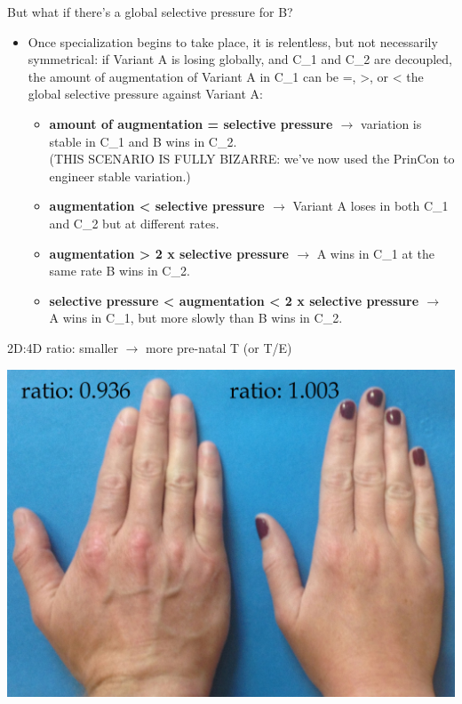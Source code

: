 \documentclass[hyperref={pdfpagelabels=false}]{beamer}
\begin{document}


\begin{frame}{But what if there's a global selective pressure for B?}
		\begin{itemize}
			\item Once specialization begins to take place, it is relentless, but not necessarily symmetrical: if Variant A is losing globally, and C_1 and C_2 are decoupled, the amount of augmentation of Variant A in C_1 can be =, >, or < the global selective pressure against Variant A:			
			\begin{itemize}
					\item \textbf{amount of augmentation = selective pressure $\rightarrow$} variation is stable in C_1 and B wins in C_2.\\(THIS SCENARIO IS FULLY BIZARRE: we've now used the PrinCon to engineer stable variation.)
					\item \textbf{augmentation < selective pressure $\rightarrow$} Variant A loses in both C_1 and C_2 but at different rates.
					\item \textbf{augmentation > 2 x selective pressure $\rightarrow$} A wins in C_1 at the same rate B wins in C_2.
					\item \textbf{selective pressure < augmentation < 2 x selective pressure $\rightarrow$} A wins in C_1, but more slowly than B wins in C_2.			
			\end{itemize}
		\end{itemize}
\end{frame}


\begin{frame}{2D:4D ratio: smaller $\rightarrow$ more pre-natal T (or T/E)}
\begin{center}
	\includegraphics[width=1.12\textwidth]{realhands2.jpg}
\end{center}
\end{frame}
\end{document}
